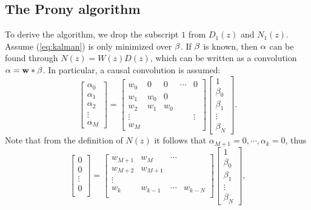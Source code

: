 \documentclass[10pt]{amsart}
\begin{document}
\subsection{The Prony algorithm}
To derive the algorithm, we drop the subscript $1$ from $D_1(z)$ and $N_1(z)$. Assume (\ref{eq:kalman}) is only minimized over $\bf \beta$. If $\bf \beta$ is known, then $\bf \alpha$ can be found through $N(z)=W(z)D(z)$, which can be written as a convolution $ {\alpha} = {\bf w} * {\bf \beta}$. In particular, a  causal convolution is assumed:
\begin{equation}
	\left[\begin{array}{c}\alpha_0 \\ \alpha_1 \\ \alpha_2 \\ \vdots \\ \alpha_M \end{array}\right] =
	\left[\begin{array}{ccccc}w_0 & 0 & 0 & \cdots & 0 \\w_1 & w_0 & 0 &   &   \\w_2 & w_1 & w_0 &   &  \\\vdots &   &   &   & \vdots \\w_M &   &   &   &  \end{array}\right]
	\left[\begin{array}{c}1 \\\beta_0 \\\beta_1 \\\vdots \\\beta_N\end{array}\right].
	\label{eq:Prony_alpha}
\end{equation} 
Note that from the definition of $N(z)$ it follows that $\alpha_{M+1}=0, \cdots, \alpha_{k}=0$, thus
\begin{equation}
	\left[\begin{array}{c}0 \\0 \\\vdots \\0 \\ \end{array}\right] =
	\left[\begin{array}{cccc}w_{M+1} & w_{M} & \cdots &   \\w_{M+2} & w_{M+1} &   &   \\\vdots &   &   &   \\w_k & w_{k-1} & \cdots & w_{k-N} \\  &   &   &  \end{array}\right]
	\left[\begin{array}{c}1 \\\beta_0 \\\beta_1 \\\vdots \\\beta_N\end{array}\right],
\end{equation}
\end{document}
